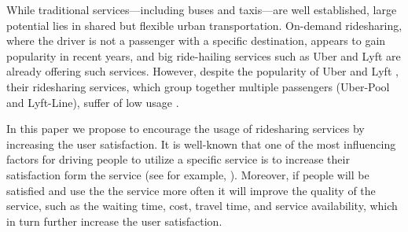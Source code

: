\documentclass[letterpaper]{article} %
\begin{document}

While traditional services---including buses and taxis---are well established, large potential lies in shared but flexible urban transportation. On-demand ridesharing, where the driver is not a passenger with a specific destination, appears to gain popularity in recent years, and big ride-hailing services such as Uber and Lyft are already offering such services. However, despite the popularity of Uber and Lyft \cite{likeUber2018}, their ridesharing services, which group together multiple passengers (Uber-Pool and Lyft-Line), suffer of low usage \cite{motherboard2016,resons2017}.


In this paper we propose to encourage the usage of ridesharing services by increasing the user satisfaction. It is well-known that one of the most influencing factors for driving people to utilize a specific service is to increase their satisfaction form the service (see for example, \cite{singh2006importance}). Moreover, if people will be satisfied and use the the service more often it will improve the quality of the service, such as the waiting time, cost, travel time, and service availability, which in turn further increase the user satisfaction.
\end{document}
